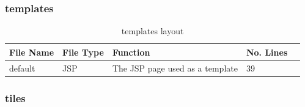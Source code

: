 \subsubsection{templates}
\begin{table}[H]
\begin{center}
\begin{tabular}{| l | l | l| l |p{1cm} |}
    \hline
    File Name & File Type & Function & No. Lines\\ \hline
	default & JSP & The JSP page used as a template& 39\\ \hline	
    \end{tabular}
\end{center}
\caption{templates layout}
\end{table}

\subsubsection{tiles}
